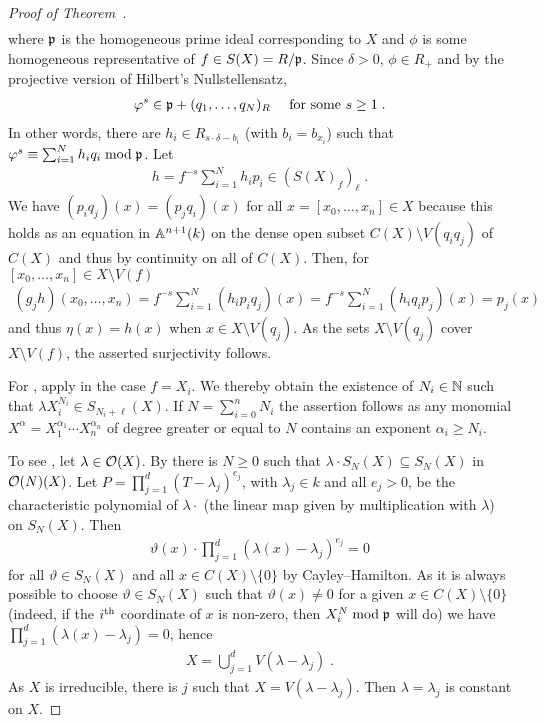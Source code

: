 \documentclass[a4paper,parskip=half,numbers=enddot, DIV=12, headheight=30pt]{scrreprt}
\begin{document}
\begin{proof}[Proof of Theorem~]
\begin{align*}
    \end{align*}
    where $\mathfrak{p}$ is the homogeneous prime ideal corresponding to $X$ and $\phi$ is some homogeneous representative of $f\in S(X) = R/\mathfrak{p}$. Since $\delta >0$, $\phi\in R_+$ and by the projective version of Hilbert's Nullstellensatz, 
    \begin{align*}
        \varphi^s \in  \mathfrak{p}+(q_1,\ldots,q_N)_R\quad\text{ for some }s\geq 1\;.
    \end{align*}
    In other words, there are $h_i\in R_{s\cdot \delta-b_i}$ (with $b_i=b_{x_i}$) such that $\varphi^s\equiv \sum_{i=1}^N h_iq_i \bmod\mathfrak{p}$. Let 
    \begin{align*}
    	h= f^{-s}\sum_{i=1}^N h_ip_i\in (S(X)_f)_\ell\;.
    \end{align*}
    We have $(p_i q_j)(x) = (p_jq_i)(x)$ for all $x=[x_0,\ldots,x_n]\in X$ because this holds as an equation in $\mathbb{A}^{n+1}(k)$ on the dense open subset $C(X)\setminus V(q_iq_j)$ of $C(X)$ and thus by continuity on all of $C(X)$. Then, for $[x_0,\ldots, x_n]\in X\setminus V(f)$ 
    \begin{align*}
        (g_jh)(x_0,\ldots, x_n) = f^{-s}\sum_{i=1}^N (h_ip_iq_j)(x)= f^{-s}\sum_{i=1}^N (h_iq_ip_j)(x) = p_j(x)
    \end{align*}
    and thus $\eta(x) = h(x)$ when $x\in X\setminus V(q_j)$. As the sets $X\setminus V(q_j)$ cover $X\setminus V(f)$, the asserted surjectivity follows.
    
    For , apply  in the case $f=X_i$. We thereby obtain the existence of $N_i\in\mathbb{N}$ such that $\lambda X_i^{N_i}\in S_{N_i+\ell}(X)$. If $N = \sum_{i=0}^n N_i$ the assertion follows as any monomial $X^\alpha=X_1^{\alpha_1}\cdots X_n^{\alpha_n}$ of degree greater or equal to $N$ contains an exponent $\alpha_i\geq N_i$.
    
    To see , let $\lambda\in \mathcal{O}(X)$. By  there is $N\geq 0$ such that $\lambda\cdot S_N(X) \subseteq S_N(X)$ in $\mathcal{O}(N)(X)$. Let $P = \prod_{j=1}^d (T-\lambda_j)^{e_j}$, with $\lambda_j\in k$ and all $e_j>0$, be the characteristic polynomial of $\lambda\cdot$ (the linear map given by multiplication with $\lambda$) on $S_N(X)$. Then 
    \begin{align*}
    	 \vartheta(x)\cdot\prod_{j=1}^d (\lambda(x)-\lambda_j)^{e_j} = 0
    \end{align*}
   for all $\vartheta\in S_N(X)$ and all $x\in C(X)\setminus \{0\}$ by Cayley--Hamilton. As it is always possible to choose $\vartheta\in S_N(X)$ such that $\vartheta(x)\neq0$ for a given $x\in C(X)\setminus\{0\}$ (indeed, if the $i^{\text{th}}$ coordinate of $x$ is non-zero, then $X_i^N\bmod\mathfrak{p}$ will do) we have $\prod_{j=1}^d (\lambda(x)-\lambda_j) = 0$, hence 
   \begin{align*}
   	X = \bigcup_{j=1}^d V(\lambda-\lambda_j)\;. 
   \end{align*}
   As $X$ is irreducible, there is $j$ such that $X = V(\lambda-\lambda_j)$. Then $\lambda=\lambda_j$ is constant on $X$. 
\end{proof}
\end{document}
